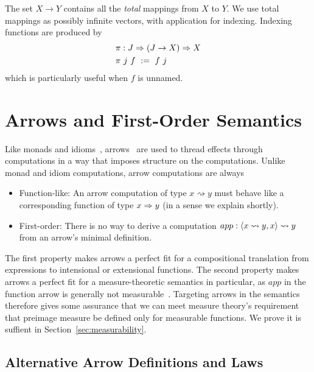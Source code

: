 \documentclass{llncs}
\newcommand{\arrow}{\rightsquigarrow}
\begin{document}
The set $X \to Y$ contains all the \emph{total} mappings from $X$ to $Y$.
We use total mappings as possibly infinite vectors, with application for indexing.
Indexing functions are produced by
\begin{equation}
\begin{aligned}
	&\pi : J \Rightarrow (J \to X) \Rightarrow X \\
	&\pi~j~f \ := \ f~j
\end{aligned}
\end{equation}
which is particularly useful when $f$ is unnamed.


\section{Arrows and First-Order Semantics}

Like monads and idioms~\cite{cit:wadler-2001-monads,cit:mcbride-2008jfp-idiom}, arrows~\cite{cit:hughes-2000scp-arrows} are used to thread effects through computations in a way that imposes structure on the computations.
Unlike monad and idiom computations, arrow computations are always
\begin{itemize}
	\item Function-like: An arrow computation of type $x \arrow y$ must behave like a corresponding function of type $x \Rightarrow y$ (in a sense we explain shortly).
	\item First-order: There is no way to derive a computation $app : \pair{x \arrow y, x} \arrow y$ from an arrow's minimal definition.
\end{itemize}
The first property makes arrows a perfect fit for a compositional translation from expressions to intensional or extensional functions.
The second property makes arrows a perfect fit for a measure-theoretic semantics in particular, as $app$ in the function arrow is generally not measurable~\cite{cit:aumann-1961ijm-borel}.
Targeting arrows in the semantics therefore gives some assurance that we can meet measure theory's requirement that preimage measure be defined only for measurable functions.
We prove it is suffient in Section~\ref{sec:measurability}.

\subsection{Alternative Arrow Definitions and Laws}
\label{sec:arrow-definitions}
\end{document}
